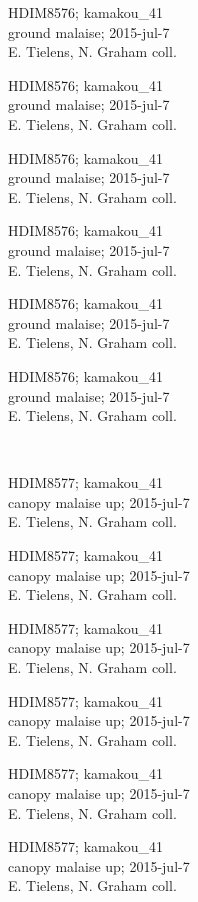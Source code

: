 \documentclass[2pt]{extarticle}
\begin{document}
\noindent
\parbox{0.16\textwidth}{\tiny \raggedright \rule[-0.3\baselineskip]{0pt}{10pt}HDIM8576; kamakou\_41\\ ground malaise; 2015-jul-7\\ E. Tielens, N. Graham coll.}
\parbox{0.16\textwidth}{\tiny \raggedright \rule[-0.3\baselineskip]{0pt}{10pt}HDIM8576; kamakou\_41\\ ground malaise; 2015-jul-7\\ E. Tielens, N. Graham coll.}
\parbox{0.16\textwidth}{\tiny \raggedright \rule[-0.3\baselineskip]{0pt}{10pt}HDIM8576; kamakou\_41\\ ground malaise; 2015-jul-7\\ E. Tielens, N. Graham coll.}
\parbox{0.16\textwidth}{\tiny \raggedright \rule[-0.3\baselineskip]{0pt}{10pt}HDIM8576; kamakou\_41\\ ground malaise; 2015-jul-7\\ E. Tielens, N. Graham coll.}
\parbox{0.16\textwidth}{\tiny \raggedright \rule[-0.3\baselineskip]{0pt}{10pt}HDIM8576; kamakou\_41\\ ground malaise; 2015-jul-7\\ E. Tielens, N. Graham coll.}
\parbox{0.16\textwidth}{\tiny \raggedright \rule[-0.3\baselineskip]{0pt}{10pt}HDIM8576; kamakou\_41\\ ground malaise; 2015-jul-7\\ E. Tielens, N. Graham coll.} \\ 
\vspace{0.001in} 

\noindent
\parbox{0.16\textwidth}{\tiny \raggedright \rule[-0.3\baselineskip]{0pt}{10pt}HDIM8577; kamakou\_41\\ canopy malaise up; 2015-jul-7\\ E. Tielens, N. Graham coll.}
\parbox{0.16\textwidth}{\tiny \raggedright \rule[-0.3\baselineskip]{0pt}{10pt}HDIM8577; kamakou\_41\\ canopy malaise up; 2015-jul-7\\ E. Tielens, N. Graham coll.}
\parbox{0.16\textwidth}{\tiny \raggedright \rule[-0.3\baselineskip]{0pt}{10pt}HDIM8577; kamakou\_41\\ canopy malaise up; 2015-jul-7\\ E. Tielens, N. Graham coll.}
\parbox{0.16\textwidth}{\tiny \raggedright \rule[-0.3\baselineskip]{0pt}{10pt}HDIM8577; kamakou\_41\\ canopy malaise up; 2015-jul-7\\ E. Tielens, N. Graham coll.}
\parbox{0.16\textwidth}{\tiny \raggedright \rule[-0.3\baselineskip]{0pt}{10pt}HDIM8577; kamakou\_41\\ canopy malaise up; 2015-jul-7\\ E. Tielens, N. Graham coll.}
\parbox{0.16\textwidth}{\tiny \raggedright \rule[-0.3\baselineskip]{0pt}{10pt}HDIM8577; kamakou\_41\\ canopy malaise up; 2015-jul-7\\ E. Tielens, N. Graham coll.} \\ 
\vspace{0.001in} 
\end{document}
